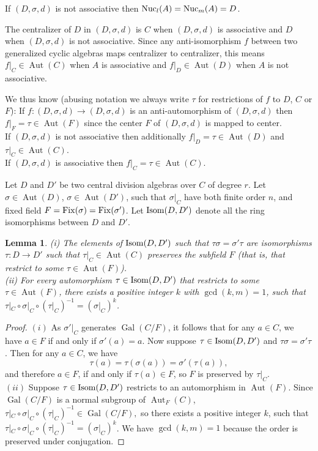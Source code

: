 \documentclass{amsart}
\theoremstyle{plain}
\newtheorem{lemma}[theorem]{Lemma}
\theoremstyle{definition}
\numberwithin{equation}{section}
\numberwithin{figure}{section}
\DeclareMathOperator{\Gal}{Gal}
\DeclareMathOperator{\Aut}{Aut}
\begin{document}
 If  $(D, \sigma, d)$ is not associative then ${\rm Nuc}_l(A)={\rm Nuc}_m(A)=D$.

The centralizer of $D$ in $(D,\sigma, d)$ is $C$ when $(D,\sigma, d)$ is associative  \cite[p.~20]{J96} and $D$ when $(D,\sigma, d)$ is not associative.
Since any anti-isomorphism $f$ between two generalized cyclic algebras maps centralizer to centralizer, this means $f|_C\in \Aut(C)$ when $A$ is associative and $f|_D\in \Aut(D)$ when $A$ is not associative.

We thus know (abusing notation we always write $\tau$ for restrictions of $f$ to $D$, $C$ or  $F$): If $f: (D,\sigma, d)\to (D,\sigma, d)$ is an anti-automorphism of  $(D,\sigma, d)$ then  $f|_F=\tau\in \Aut(F)$ since the center $F$ of $(D,\sigma, d)$  is mapped to center.
\\ If  $(D,\sigma, d)$ is not associative then additionally $f|_D=\tau\in \Aut(D)$ and  $\tau|_C\in \Aut(C)$.
\\ If  $(D,\sigma, d)$ is associative then  $f|_C=\tau\in \Aut(C)$.

Let $D$ and $D'$ be two central division algebras over $C$ of degree $r$. Let $\sigma\in \Aut (D)$, $\sigma\in \Aut (D')$,
such that $\sigma|_{C}$ have both finite order $n$,  and fixed field $F={\rm Fix}(\sigma)={\rm Fix}(\sigma')$. Let ${\rm Isom}(D, D')$ denote all the ring isomorphisms between $D$ and $D'$.

\begin{lemma}\label{le:degreek2}
    (i) The elements of ${\rm Isom}(D, D')$ such that $\tau \sigma = \sigma' \tau$ are  isomorphisms $\tau:D\to D'$ such that $\tau|_C\in \Aut(C)$  preserves the subfield $F$ (that is, that restrict to some $\tau\in \Aut(F)$).
    \\ (ii) For every automorphism $\tau\in {\rm Isom}(D, D')$ that restricts  to some $\tau\in \Aut(F)$, there exists a positive integer $k$ with $\gcd(k,m)=1$, such that $\tau|_C \circ \sigma|_C \circ (\tau|_C)^{-1}=(\sigma|_C)^k$.
\end{lemma}

\begin{proof}
$(i)$  As ${\sigma'}|_C$ generates $\Gal(C/F)$, it follows that for any $a\in C$, we have $a\in F$ if and only if $\sigma'(a)=a$.  Now suppose $\tau\in {\rm Isom}(D, D')$ and  $\tau \sigma = \sigma' \tau$.  Then for any $a\in C$, we have
$$
\tau(a) = \tau(\sigma(a))=\sigma'(\tau(a)),
$$
and therefore $a\in F$,  if and only if $\tau(a)\in F$,
so $F$ is preserved by $\tau|_C$.
\\ $(ii)$  Suppose $\tau\in {\rm Isom}(D, D')$  restricts to an automorphism in $\Aut(F)$.  Since $\Gal (C/F)$ is a normal subgroup of $\Aut_F(C)$,  $\tau|_C \circ \sigma|_C \circ (\tau|_C)^{-1}\in \Gal (C/F),$ so there exists a positive integer $k$, such that
$\tau|_C \circ \sigma|_C \circ (\tau|_C)^{-1}=(\sigma|_C)^k$. We have  $\gcd(k,m)=1$ because the order is preserved under conjugation.
\end{proof}
\end{document}
